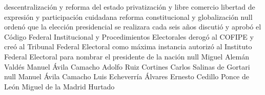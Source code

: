 \documentclass[10pt,a4paper]{article}
\begin{document}
\begin{multicols*}{2}
				{descentralización y reforma del estado}
				{privatización y libre comercio}
				{libertad de expresión y participación cuidadana}
				{reforma constitucional y globalización}
			{null}
				{ordenó que la elección presidencial se realizara cada seis años}
				{discutió y aprobó el Código Federal Institucional y Procedimientos Electorales}
				{derogó al COFIPE y creó al Tribunal Federal Electoral como máxima  instancia}
				{autorizó al Instituto Federal Electoral para nombrar el presidente de la nación}
			{null}
				{Miguel Alemán Valdés}
				{Manuel Ávila Camacho}
				{Adolfo Ruiz Cortines}
				{Carlos Salinas de Gortari}
			{null}
				{Manuel Ávila Camacho}
				{Luis Echeverría Álvares}
				{Ernesto Cedillo Ponce de León}
				{Miguel de la Madrid Hurtado}	
	\end{multicols*}
	
\end{document}
